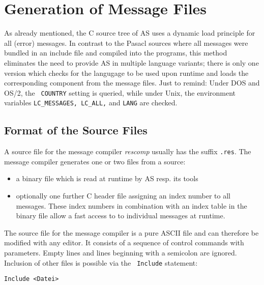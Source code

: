 \documentclass[12pt,twoside]{report}
\begin{document}

\section{Generation of Message Files}

As already mentioned, the C source tree of AS uses a dynamic load
principle for all (error) messages.  In contrast to the Pasacl sources
where all messages were bundled in an include file and compiled into the
programs, this method eliminates the need to provide AS in multiple
language variants; there is only one version which checks for the
langugage to be used upon runtime and loads the corresponding component
from the message files.  Just to remind: Under DOS and OS/2, the {\tt
COUNTRY} setting is queried, while under Unix, the environment variables
{\tt LC\_MESSAGES, LC\_ALL,} and {\tt LANG} are checked.

\subsection{Format of the Source Files}

A source file for the message compiler {\em rescomp} usually has the
suffix {\tt .res}.  The message compiler generates one or two files from a
source:
\begin{itemize}
\item{a binary file which is read at runtime by AS resp. its tools}
\item{optionally one further C header file assigning an index number to
      all messages. These index numbers in combination with an index
      table in the binary file allow a fast access to to individual
      messages at runtime.}
\end{itemize}

The source file for the message compiler is a pure ASCII file and can
therefore be modified with any editor.  It consists of a sequence of
control commands with parameters.  Empty lines and lines beginning with a
semicolon are ignored.  Inclusion of other files is possible via the {\tt
Include} statement:
\begin{verbatim}
Include <Datei>
\end{verbatim}
\end{document}
